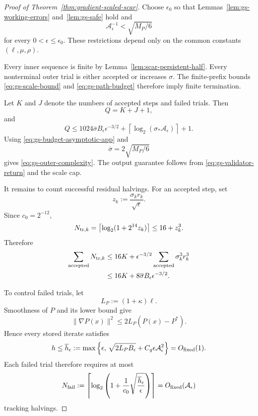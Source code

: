 \begin{proof}[Proof of Theorem~\ref{thm:gradient-scaled-scar}]
Choose $\epsilon_0$ so that
Lemmas~\ref{lem:gs-working-errors} and~\ref{lem:gs-safe} hold and
\[
    \mathcal A_\epsilon^{-1}
    <
    \sqrt{M_P/6}
\]
for every $0<\epsilon\le\epsilon_0$.
These restrictions depend only on the common constants
$(\ell,\mu,\rho)$.

Every inner sequence is finite by
Lemma~\ref{lem:scar-persistent-half}.
Every nonterminal outer trial is either accepted or increases
$\sigma$.
The finite-prefix bounds
\eqref{eq:gs-scale-bound} and
\eqref{eq:gs-path-budget}
therefore imply finite termination.

Let $K$ and $J$ denote the numbers of accepted steps and failed
trials. Then
\[
    Q=K+J+1,
\]
and
\[
    Q
    \le
    1024\overline\sigma
    B_\epsilon
    \epsilon^{-3/2}
    +
    \left\lceil
        \log_2(
            \sigma_*
            \mathcal A_\epsilon
        )
    \right\rceil
    +1.
\]
Using
\eqref{eq:gs-budget-asymptotic-app} and
\[
    \overline\sigma
    =
    2\sqrt{M_P/6}
\]
gives
\eqref{eq:gs-outer-complexity}.
The output guarantee follows from
\eqref{eq:gs-validator-return} and the scale cap.

It remains to count successful residual halvings.
For an accepted step, set
\[
    z_k
    :=
    \frac{
        \sigma_kr_k
    }{
        \sqrt\epsilon
    }.
\]
Since $c_0=2^{-12}$,
\[
    N_{{\rm tr},k}
    =
    \left\lceil
        \log_2(1+2^{14}z_k)
    \right\rceil
    \le
    16+z_k^3.
\]
Therefore
\begin{align}
    \sum_{\rm accepted}
    N_{{\rm tr},k}
    &\le
    16K
    +
    \epsilon^{-3/2}
    \sum_{\rm accepted}
    \sigma_k^3r_k^3
    \notag\\
    &\le
    16K
    +
    8\overline\sigma
    B_\epsilon
    \epsilon^{-3/2}.
    \label{eq:gs-accepted-tracking}
\end{align}

To control failed trials, let
\[
    L_P:=(1+\kappa)\ell.
\]
Smoothness of $P$ and its lower bound give
\[
    \|\nabla P(x)\|^2
    \le
    2L_P(P(x)-P^*).
\]
Hence every stored iterate satisfies
\[
    h
    \le
    \overline h_\epsilon
    :=
    \max\left\{
        \epsilon,\,
        \sqrt{2L_PB_\epsilon}
        +
        C_g\epsilon
        \mathcal A_\epsilon^2
    \right\}
    =
    O_{\rm fixed}(1).
\]
Each failed trial therefore requires at most
\[
    N_{\rm fail}
    :=
    \left\lceil
        \log_2\left(
            1+
            \frac1{c_0}
            \sqrt{
                \frac{\overline h_\epsilon}{\epsilon}
            }
        \right)
    \right\rceil
    =
    O_{\rm fixed}(\mathcal A_\epsilon)
\]
tracking halvings.


\end{proof}
